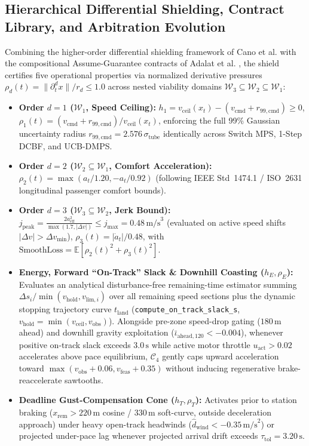 \documentclass[10pt,a4paper]{article}
\begin{document}
\subsection{Hierarchical Differential Shielding, Contract Library, and Arbitration Evolution}
Combining the higher-order differential shielding framework of Cano et al. \cite{ref10} with the compositional Assume-Guarantee contracts of Adalat et al. \cite{ref11, ref12}, the shield certifies five operational properties via normalized derivative pressures $\rho_d(t) = \|\partial_t^d x\| / r_d \le 1.0$ across nested viability domains $\mathcal{W}_3 \subseteq \mathcal{W}_2 \subseteq \mathcal{W}_1$:
\begin{itemize}
    \item \textbf{Order $d=1$ ($\mathcal{W}_1$, Speed Ceiling):} $h_1 = v_{\text{ceil}}(x_t) - (v_{\text{cmd}} + r_{99,\text{cmd}}) \ge 0$, $\rho_1(t) = (v_{\text{cmd}} + r_{99,\text{cmd}}) / v_{\text{ceil}}(x_t)$, enforcing the full 99\% Gaussian uncertainty radius $r_{99,\text{cmd}} = 2.576\,\sigma_{\text{tube}}$ identically across Switch MPS, 1-Step DCBF, and UCB-DMPS.
    \item \textbf{Order $d=2$ ($\mathcal{W}_2 \subseteq \mathcal{W}_1$, Comfort Acceleration):} $\rho_2(t) = \max(a_t / 1.20, -a_t / 0.92)$ (following IEEE Std~1474.1 / ISO~2631 longitudinal passenger comfort bounds).
    \item \textbf{Order $d=3$ ($\mathcal{W}_3 \subseteq \mathcal{W}_2$, Jerk Bound):} $j_{\text{peak}} = \frac{2a_{\text{eff}}^2}{\max(1.7, |\Delta v|)} \le j_{\max} = 0.48\,\text{m/s}^3$ (evaluated on active speed shifts $|\Delta v| > \Delta v_{\min}$), $\rho_3(t) = |\dot{a}_t| / 0.48$, with $\text{SmoothLoss} = \mathbb{E}[\rho_2(t)^2 + \rho_3(t)^2]$.
    \item \textbf{Energy, Forward ``On-Track'' Slack & Downhill Coasting ($h_E, \rho_E$):} Evaluates an analytical disturbance-free remaining-time estimator summing $\Delta s_i / \min(v_{\text{hold}}, v_{\text{lim},i})$ over all remaining speed sections plus the dynamic stopping trajectory curve $t_{\text{land}}$ (\texttt{compute\_on\_track\_slack\_s}, $v_{\text{hold}} = \min(v_{\text{ceil}}, v_{\text{obs}})$). Alongside pre-zone speed-drop gating ($180\,\text{m}$ ahead) and downhill gravity exploitation ($\bar{\iota}_{\text{ahead},120} < -0.004$), whenever positive on-track slack exceeds $3.0\,\text{s}$ while active motor throttle $u_{\text{act}} > 0.02$ accelerates above pace equilibrium, $\mathcal{C}_4$ gently caps upward acceleration toward $\max(v_{\text{obs}} + 0.06, v_{\text{feas}} + 0.35)$ without inducing regenerative brake-reaccelerate sawtooths.
    \item \textbf{Deadline Gust-Compensation Cone ($h_T, \rho_T$):} Activates prior to station braking ($x_{\text{rem}} > 220\,\text{m}$ cosine / $330\,\text{m}$ soft-curve, outside deceleration approach) under heavy open-track headwinds ($\hat{d}_{\text{wind}} < -0.35\,\text{m/s}^2$) or projected under-pace lag whenever projected arrival drift exceeds $\tau_{\text{tol}} = 3.20\,\text{s}$.
\end{itemize}
\end{document}
